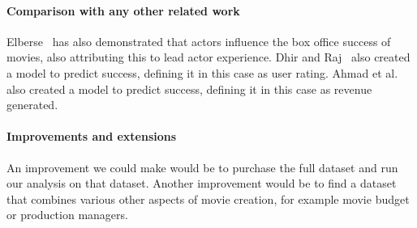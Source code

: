 \begin{multicols}{2}
        \paragraph{Comparison with any other related work}
            Elberse~\cite{elberse2007power} has also demonstrated that actors influence the 
                box office success of movies, also attributing this to lead actor experience.
            Dhir and Raj~\cite{dhirRaj} also created a model to predict success, defining it in
                this case as user rating. 
            Ahmad et al.~\cite{ahmadDuraisamyYousefBuckles} also created a model to predict success,
                defining it in this case as revenue generated.

        \paragraph{Improvements and extensions}
        An improvement we could make would be to purchase the full dataset and run our
            analysis on that dataset.
        Another improvement would be to find a dataset that combines various other aspects of
            movie creation, for example movie budget or production managers.
        
    \end{multicols}